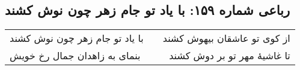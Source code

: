 \begin{center}
\section*{رباعی شماره ۱۵۹: با یاد تو جام زهر چون نوش کشند}
\label{sec:sh159}
\begin{longtable}{l p{0.5cm} r}
با یاد تو جام زهر چون نوش کشند
&&
از کوی تو عاشقان بیهوش کشند
\\
بنمای به زاهدان جمال رخ خویش
&&
تا غاشیهٔ مهر تو بر دوش کشند
\\
\end{longtable}
\end{center}

